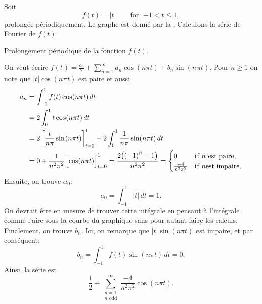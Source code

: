 \begin{example}
Soit
\begin{equation*}
f(t) =
\lvert t \rvert
\qquad \text{for } \; {-1} < t \leq 1,
\end{equation*}
prolongée périodiquement.  Le graphe est donné par la .
Calculons la série de Fourier de $f(t)$.

\begin{myfig}
\capstart
{}
\caption{Prolongement périodique de la fonction $f(t)$.\label{gfs:sawcontfig}}
\end{myfig}

On veut écrire $f(t) = \frac{a_0}{2} + \sum_{n=1}^\infty a_n \cos (n \pi t) + b_n
\sin (n \pi t)$.  Pour $n \geq 1$ on note que $\lvert t \rvert \cos (n \pi t)$
est paire et aussi
\begin{equation*}
\begin{split}
a_n & = \int_{-1}^1 f(t) \cos (n \pi t) \, dt \\
& = 2 \int_{0}^1 t \cos (n \pi t) \, dt \\
 & = 2 \left[ \frac{t}{n \pi} \sin (n \pi t) \right]_{t=0}^1 -
2 \int_{0}^1 \frac{1}{n \pi} \sin (n \pi t) \, dt \\
& =  0 + \frac{1}{n^2 \pi^2} \Bigl[ \cos (n \pi t) \Bigr]_{t=0}^1
 =  \frac{2 \bigl( {(-1)}^n -1 \bigr) }{n^2 \pi^2}
=
\begin{cases}
0 & \text{if } n \text{ est paire} , \\
\frac{-4 }{n^2 \pi^2} & \text{if } n \text{est impaire}  .
\end{cases}
\end{split}
\end{equation*}
Ensuite, on trouve $a_0$:
\begin{equation*}
a_0 = \int_{-1}^1 \lvert t \rvert \, dt 
=
1 .
\end{equation*}
On devrait être en mesure de trouver cette intégrale en pensant à l'intégrale comme l'aire sous la courbe du graphique sans pour autant faire les calculs. Finalement, on trouve $b_n$.  Ici, on remarque que
$\lvert t \rvert \sin (n \pi t)$ est impaire, et par conséquent: 
\begin{equation*}
b_n = \int_{-1}^1 f(t) \sin (n \pi t) \, dt = 0 .
\end{equation*}
Ainsi, la série est
\begin{equation*}
\frac{1}{2} + 
\sum_{\substack{n=1 \\ n \text{ odd}}}^\infty \frac{-4}{n^2 \pi^2} \cos (n \pi t) .
\end{equation*}


\end{example}
